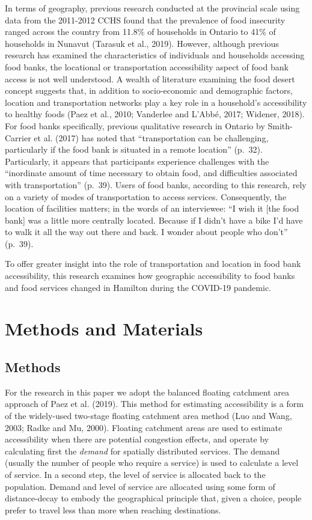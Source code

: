 \documentclass[]{elsarticle} %
\begin{document}
In terms of geography, previous research conducted at the provincial
scale using data from the 2011-2012 CCHS found that the prevalence of
food insecurity ranged across the country from 11.8\% of households in
Ontario to 41\% of households in Nunavut (Tarasuk et al., 2019).
However, although previous research has examined the characteristics of
individuals and households accessing food banks, the locational or
transportation accessibility aspect of food bank access is not well
understood. A wealth of literature examining the food desert concept
suggests that, in addition to socio-economic and demographic factors,
location and transportation networks play a key role in a household's
accessibility to healthy foods (Paez et al., 2010; Vanderlee and L'Abbé,
2017; Widener, 2018). For food banks specifically, previous qualitative
research in Ontario by Smith-Carrier et al. (2017) has noted that
``transportation can be challenging, particularly if the food bank is
situated in a remote location'' (p.~32). Particularly, it appears that
participants experience challenges with the ``inordinate amount of time
necessary to obtain food, and difficulties associated with
transportation'' (p.~39). Users of food banks, according to this
research, rely on a variety of modes of transportation to access
services. Consequently, the location of facilities matters; in the words
of an interviewee: ``I wish it {[}the food bank{]} was a little more
centrally located. Because if I didn't have a bike I'd have to walk it
all the way out there and back. I wonder about people who don't''
(p.~39).

To offer greater insight into the role of transportation and location in
food bank accessibility, this research examines how geographic
accessibility to food banks and food services changed in Hamilton during
the COVID-19 pandemic.

\hypertarget{methods-and-materials}{%
\section{Methods and Materials}\label{methods-and-materials}}

\hypertarget{methods}{%
\subsection{Methods}\label{methods}}

For the research in this paper we adopt the balanced floating catchment
area approach of Paez et al. (2019). This method for estimating
accessibility is a form of the widely-used two-stage floating catchment
area method (Luo and Wang, 2003; Radke and Mu, 2000). Floating catchment
areas are used to estimate accessibility when there are potential
congestion effects, and operate by calculating first the \emph{demand}
for spatially distributed services. The demand (usually the number of
people who require a service) is used to calculate a level of service.
In a second step, the level of service is allocated back to the
population. Demand and level of service are allocated using some form of
distance-decay to embody the geographical principle that, given a
choice, people prefer to travel less than more when reaching
destinations.
\end{document}
